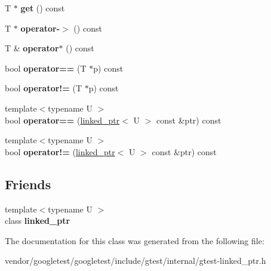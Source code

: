 \begin{DoxyCompactItemize}
\item 
T $\ast$ {\bfseries get} () const \hypertarget{classtesting_1_1internal_1_1linked__ptr_a6ea8584d9bcad13c3266834f5ce5e771}{}\label{classtesting_1_1internal_1_1linked__ptr_a6ea8584d9bcad13c3266834f5ce5e771}

\item 
T $\ast$ {\bfseries operator-\/$>$} () const \hypertarget{classtesting_1_1internal_1_1linked__ptr_aa878c3e874242fb3cd2aa14ec603aa25}{}\label{classtesting_1_1internal_1_1linked__ptr_aa878c3e874242fb3cd2aa14ec603aa25}

\item 
T \& {\bfseries operator$\ast$} () const \hypertarget{classtesting_1_1internal_1_1linked__ptr_aec393cbd60f96defde36ef8a69d94254}{}\label{classtesting_1_1internal_1_1linked__ptr_aec393cbd60f96defde36ef8a69d94254}

\item 
bool {\bfseries operator==} (T $\ast$p) const \hypertarget{classtesting_1_1internal_1_1linked__ptr_abe2154fd3ad3574dfe6f2320bc1debc4}{}\label{classtesting_1_1internal_1_1linked__ptr_abe2154fd3ad3574dfe6f2320bc1debc4}

\item 
bool {\bfseries operator!=} (T $\ast$p) const \hypertarget{classtesting_1_1internal_1_1linked__ptr_a3685f9661bbe410cfa58fea2f14396b7}{}\label{classtesting_1_1internal_1_1linked__ptr_a3685f9661bbe410cfa58fea2f14396b7}

\item 
{\footnotesize template$<$typename U $>$ }\\bool {\bfseries operator==} (\hyperlink{classtesting_1_1internal_1_1linked__ptr}{linked\+\_\+ptr}$<$ U $>$ const \&ptr) const \hypertarget{classtesting_1_1internal_1_1linked__ptr_a3b46c9ecfd928673a524dcb3c70fd2ad}{}\label{classtesting_1_1internal_1_1linked__ptr_a3b46c9ecfd928673a524dcb3c70fd2ad}

\item 
{\footnotesize template$<$typename U $>$ }\\bool {\bfseries operator!=} (\hyperlink{classtesting_1_1internal_1_1linked__ptr}{linked\+\_\+ptr}$<$ U $>$ const \&ptr) const \hypertarget{classtesting_1_1internal_1_1linked__ptr_a6449584b90a09a313300599fb3a23633}{}\label{classtesting_1_1internal_1_1linked__ptr_a6449584b90a09a313300599fb3a23633}

\end{DoxyCompactItemize}
\subsection*{Friends}
\begin{DoxyCompactItemize}
\item 
{\footnotesize template$<$typename U $>$ }\\class {\bfseries linked\+\_\+ptr}\hypertarget{classtesting_1_1internal_1_1linked__ptr_a7763f286ca03a7f7363a033d996c8c1c}{}\label{classtesting_1_1internal_1_1linked__ptr_a7763f286ca03a7f7363a033d996c8c1c}

\end{DoxyCompactItemize}


The documentation for this class was generated from the following file\+:\begin{DoxyCompactItemize}
\item 
vendor/googletest/googletest/include/gtest/internal/gtest-\/linked\+\_\+ptr.\+h\end{DoxyCompactItemize}
